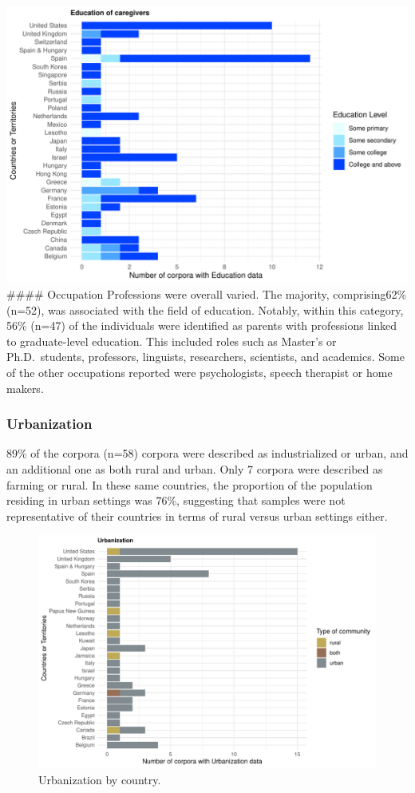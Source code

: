 \documentclass[
  man,floatsintext]{apa6}
\begin{document}
\includegraphics{CHILDES_short_files/figure-latex/figure3 -1.pdf}
\#\#\#\# Occupation
Professions were overall varied. The majority, comprising62\% (n=52), was associated with the field of education. Notably, within this category, 56\% (n=47) of the individuals were identified as parents with professions linked to graduate-level education. This included roles such as Master's or Ph.D.~students, professors, linguists, researchers, scientists, and academics. Some of the other occupations reported were psychologists, speech therapist or home makers.

\hypertarget{urbanization-1}{%
\subsubsection{Urbanization}\label{urbanization-1}}

89\% of the corpora (n=58) corpora were described as industrialized or urban, and an additional one as both rural and urban. Only 7 corpora were described as farming or rural. In these same countries, the proportion of the population residing in urban settings was 76\%, suggesting that samples were not representative of their countries in terms of rural versus urban settings either.

\begin{figure}
\centering
\includegraphics{CHILDES_short_files/figure-latex/figure4-1.pdf}
\caption{\label{fig:figure4}Urbanization by country.}
\end{figure}
\end{document}
